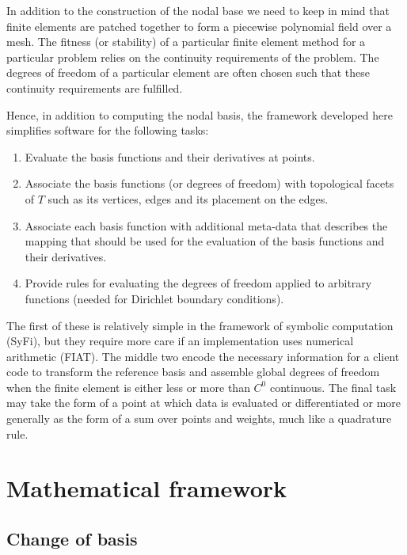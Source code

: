 In addition to the construction of the nodal base we need to keep
in mind that finite elements are patched together to form a piecewise
polynomial field over a mesh. The fitness (or stability) of a particular
finite element method for a particular problem relies on the continuity
requirements of the problem. The degrees of freedom of a particular
element are often chosen such that these continuity requirements are
fulfilled.

Hence, in addition to computing the nodal basis, the framework developed
here simplifies software for the following tasks:
%
\begin{enumerate}
\item Evaluate the basis functions and their derivatives at points.

\item Associate the basis functions (or degrees of freedom) with
topological facets of $T$ such as its vertices, edges and its
placement on the edges.

\item Associate each basis function with additional meta-data that
describes the mapping that should be used for the evaluation of the
basis functions and their derivatives.

\item Provide rules for evaluating the degrees of freedom applied to
arbitrary functions (needed for Dirichlet boundary conditions).
\end{enumerate}
%
The first of these is relatively simple in the framework of symbolic
computation (SyFi), but they require more care if an implementation
uses numerical arithmetic (FIAT).  The middle two encode the necessary
information for a client code to transform the reference basis and
assemble global degrees of freedom when the finite element is either
less or more than $C^0$ continuous. The final task may take the form of
a point at which data is evaluated or differentiated or more generally
as the form of a sum over points and weights, much like a quadrature rule.

\section{Mathematical framework}
\subsection{Change of basis}

